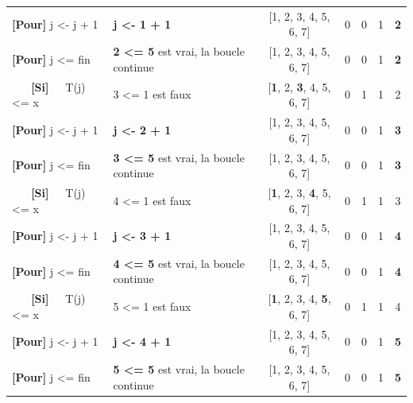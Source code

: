 \documentclass[10pt]{article} %
\newcommand{\asgold}[1]{\textcolor{mygold}{{\bf#1}}}
\newcommand{\asgr}[1]{\textcolor{mygreen}{{\bf#1}}}
\newcommand{\aspurp}[1]{\textcolor{mypurp}{{\bf#1}}}
\begin{document}
\begin{table}[h!]
\begin{tabular}{ll|ccccc}
    \asgr{[Pour]} j \textless{}- j + 1  &  \asgold{j \textless{}- 1 + 1}                                                              & {[}1, 2, 3, 4, 5, 6, 7{]} & 0      & 0      & 1& \asgold{2} \\
    \asgr{[Pour]} j \textless{}= fin      & \aspurp{2 \textless{}= 5} est vrai, la boucle continue                 & {[}1, 2, 3, 4, 5, 6, 7{]} & 0      & 0      & 1& \aspurp{2} \\
    \asgr{\ \ \ [Si]\ \ } T(j) \textless{}= x       & \cellcolor{mypurp} 3 \textless{}= 1 est faux                                     & {[}\aspurp{1}, 2, \aspurp{3}, 4, 5, 6, 7{]} & 0      & 1      & 1& 2 \\

    \asgr{[Pour]} j \textless{}- j + 1  &  \asgold{j \textless{}- 2 + 1}                                                              & {[}1, 2, 3, 4, 5, 6, 7{]} & 0      & 0      & 1& \asgold{3} \\
    \asgr{[Pour]} j \textless{}= fin      & \aspurp{3 \textless{}= 5} est vrai, la boucle continue                 & {[}1, 2, 3, 4, 5, 6, 7{]} & 0      & 0      & 1& \aspurp{3} \\
    \asgr{\ \ \ [Si]\ \ } T(j) \textless{}= x       & \cellcolor{mypurp} 4 \textless{}= 1 est faux                                     & {[}\aspurp{1}, 2, 3, \aspurp{4}, 5, 6, 7{]} & 0      & 1      & 1& 3 \\
    \asgr{[Pour]} j \textless{}- j + 1  &  \asgold{j \textless{}- 3 + 1}                                                              & {[}1, 2, 3, 4, 5, 6, 7{]} & 0      & 0      & 1& \asgold{4} \\
    \asgr{[Pour]} j \textless{}= fin      & \aspurp{4 \textless{}= 5} est vrai, la boucle continue                 & {[}1, 2, 3, 4, 5, 6, 7{]} & 0      & 0      & 1& \aspurp{4} \\
    \asgr{\ \ \ [Si]\ \ } T(j) \textless{}= x       & \cellcolor{mypurp} 5 \textless{}= 1 est faux                                     & {[}\aspurp{1}, 2, 3, 4, \aspurp{5}, 6, 7{]} & 0      & 1      & 1& 4 \\
    \asgr{[Pour]} j \textless{}- j + 1  &  \asgold{j \textless{}- 4 + 1}                                                              & {[}1, 2, 3, 4, 5, 6, 7{]} & 0      & 0      & 1& \asgold{5} \\
    \asgr{[Pour]} j \textless{}= fin      & \aspurp{5 \textless{}= 5} est vrai, la boucle continue                 & {[}1, 2, 3, 4, 5, 6, 7{]} & 0      & 0      & 1& \aspurp{5} \\

\end{tabular}
\end{table}
\end{document}
